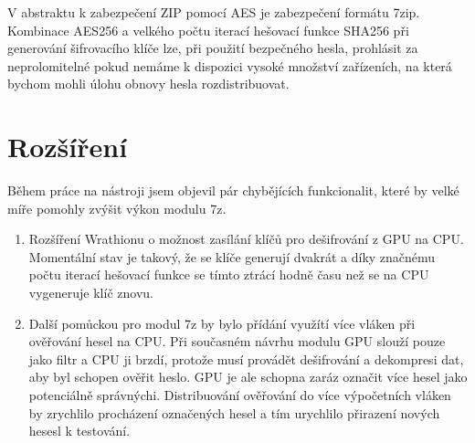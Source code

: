 V abstraktu k zabezpečení ZIP pomocí AES je zabezpečení formátu 7zip. Kombinace AES256 a velkého
počtu iterací hešovací funkce SHA256 při generování šifrovacího klíče lze, při použití bezpečného
hesla, prohlásit za neprolomitelné pokud nemáme k dispozici vysoké množství zařízeních, na která
bychom mohli úlohu obnovy hesla rozdistribuovat.



\section{Rozšíření}
Během práce na nástroji jsem objevil pár chybějících funkcionalit, které by velké míře pomohly
zvýšit výkon modulu 7z.
\begin{enumerate}
   \item Rozšíření Wrathionu o možnost zasílání klíčů pro dešifrování z GPU na CPU. Momentální
       stav je takový, že se klíče generují dvakrát a díky značnému počtu iterací hešovací funkce
       se tímto ztrácí hodně času než se na CPU vygeneruje klíč znovu.
    \item Další pomůckou pro modul 7z by bylo přídání využítí více vláken při ověřování hesel na
	CPU. Při současném návrhu modulu GPU slouží pouze jako filtr a CPU ji brzdí, protože musí
	provádět dešifrování a dekompresi dat, aby byl schopen ověřit heslo. GPU je ale schopna
	zaráz označit více hesel jako potenciálně správnýchi. Distribuování ověřování do
	více výpočetních vláken by zrychlilo procházení označených hesel a tím urychlilo
	přirazení nových hesesl k testování.
\end{enumerate}

